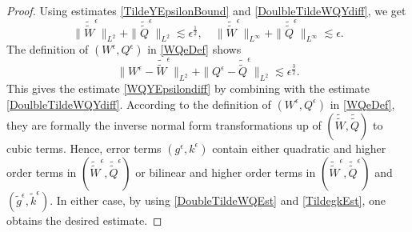 \documentclass[12pt]{amsart}
\theoremstyle{remark}
\theoremstyle{definition}
\numberwithin{equation}{section}
\newcommand{\e}{\epsilon}
\newcommand{\f}{\frac}
\begin{document}
\begin{proof}
Using estimates \eqref{TildeYEpsilonBound} and \eqref{DoulbleTildeWQYdiff}, we get 
\begin{equation} \label{DoubleTildeWQEst}
\|\tilde{\tilde{W}}^\epsilon \|_{L^2} + \|\tilde{\tilde{Q}}^\epsilon \|_{L^2}\lesssim \epsilon^\f12, \quad \|\tilde{\tilde{W}}^\epsilon \|_{L^\infty} + \|\tilde{\tilde{Q}}^\epsilon \|_{L^\infty} \lesssim \epsilon.
\end{equation}
The definition of $(W^\e, Q^\e)$ in \eqref{WQeDef} shows
\begin{equation*}
 \|W^\epsilon - \tilde{\tilde{W}}^\epsilon\|_{L^2} + \|Q^\epsilon - \tilde{\tilde{Q}}^\epsilon\|_{L^2} \lesssim \epsilon^\f32.  
\end{equation*}
This gives the estimate \eqref{WQYEpsilondiff} by combining with the estimate \eqref{DoulbleTildeWQYdiff}.
According to the definition of $(W^\epsilon, Q^\epsilon)$ in \eqref{WQeDef}, they are formally the inverse normal form transformations up of $(\tilde{\tilde{W}}, \tilde{\tilde{Q}})$ to cubic terms. 
Hence, error terms $(g^\epsilon, k^\epsilon)$ contain either quadratic and higher order terms in $(\tilde{\tilde{W}}^\e, \tilde{\tilde{Q}}^\e)$ or bilinear and higher order terms in $(\tilde{\tilde{W}}^\e, \tilde{\tilde{Q}}^\e)$ and $(\tilde{g}^\e, \tilde{k}^\e)$.
In either case, by using \eqref{DoubleTildeWQEst} and \eqref{TildegkEst}, one obtains the desired estimate.
\end{proof}
\end{document}
